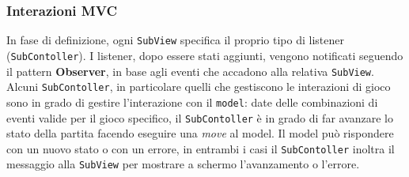 \subsubsection{Interazioni MVC}
In fase di definizione, ogni \texttt{SubView} specifica il proprio tipo di listener (\texttt{SubContoller}).
%
I listener, dopo essere stati aggiunti, vengono notificati seguendo il pattern \textbf{Observer}, in base agli eventi che accadono alla relativa \texttt{SubView}.
Alcuni \texttt{SubContoller}, in particolare quelli che gestiscono le interazioni di gioco sono in grado di gestire l'interazione con il \texttt{model}: date delle combinazioni di eventi valide per il gioco specifico, il \texttt{SubContoller} è in grado di far avanzare lo stato della partita facendo eseguire una \textit{move} al model.
%
Il model può rispondere con un nuovo stato o con un errore, in entrambi i casi il \texttt{SubContoller} inoltra il messaggio alla \texttt{SubView} per mostrare a schermo l'avanzamento o l'errore.

